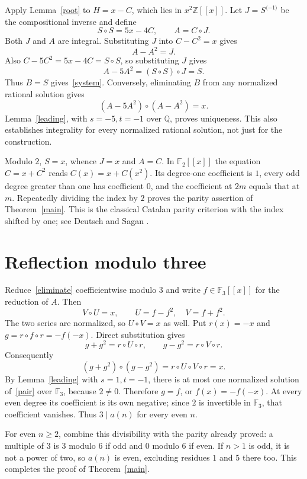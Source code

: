 \documentclass[11pt]{article}
\newcommand{\Z}{\mathbb Z}
\newcommand{\Q}{\mathbb Q}
\newcommand{\F}{\mathbb F}
\begin{document}
Apply Lemma~\ref{root} to $H=x-C$, which lies in $x^2\Z[[x]]$. Let $J=S^{\langle-1\rangle}$ be the compositional inverse and define
\begin{equation}\label{construct}
 S\circ S=5x-4C,\qquad A=C\circ J.
\end{equation}
Both $J$ and $A$ are integral. Substituting $J$ into $C-C^2=x$ gives
\[
 A-A^2=J.
\]
Also $C-5C^2=5x-4C=S\circ S$, so substituting $J$ gives
\[
 A-5A^2=(S\circ S)\circ J=S.
\]
Thus $B=S$ gives~\eqref{system}. Conversely, eliminating $B$ from any normalized rational solution gives
\begin{equation}\label{eliminate}
 (A-5A^2)\circ(A-A^2)=x.
\end{equation}
Lemma~\ref{leading}, with $s=-5,t=-1$ over $\Q$, proves uniqueness. This also establishes integrality for every normalized rational solution, not just for the construction.

Modulo $2$, $S=x$, whence $J=x$ and $A=C$. In $\F_2[[x]]$ the equation $C=x+C^2$ reads $C(x)=x+C(x^2)$. Its degree-one coefficient is $1$, every odd degree greater than one has coefficient $0$, and the coefficient at $2m$ equals that at $m$. Repeatedly dividing the index by $2$ proves the parity assertion of Theorem~\ref{main}. This is the classical Catalan parity criterion with the index shifted by one; see Deutsch and Sagan \cite[Theorem 2.1 and its immediate corollary]{deutsch-sagan}.

\section{Reflection modulo three}
Reduce~\eqref{eliminate} coefficientwise modulo $3$ and write $f\in\F_3[[x]]$ for the reduction of $A$. Then
\begin{equation}\label{pair}
 V\circ U=x,\qquad U=f-f^2,\quad V=f+f^2.
\end{equation}
The two series are normalized, so $U\circ V=x$ as well. Put $r(x)=-x$ and $g=r\circ f\circ r=-f(-x)$. Direct substitution gives
\[
 g+g^2=r\circ U\circ r,\qquad
 g-g^2=r\circ V\circ r.
\]
Consequently
\[
 (g+g^2)\circ(g-g^2)
   =r\circ U\circ V\circ r=x.
\]
By Lemma~\ref{leading} with $s=1,t=-1$, there is at most one normalized solution of~\eqref{pair} over $\F_3$, because $2\ne0$. Therefore $g=f$, or $f(x)=-f(-x)$. At every even degree its coefficient is its own negative; since $2$ is invertible in $\F_3$, that coefficient vanishes. Thus $3\mid a(n)$ for every even $n$.

For even $n\geq2$, combine this divisibility with the parity already proved: a multiple of $3$ is $3$ modulo $6$ if odd and $0$ modulo $6$ if even. If $n>1$ is odd, it is not a power of two, so $a(n)$ is even, excluding residues $1$ and $5$ there too. This completes the proof of Theorem~\ref{main}.
\end{document}

